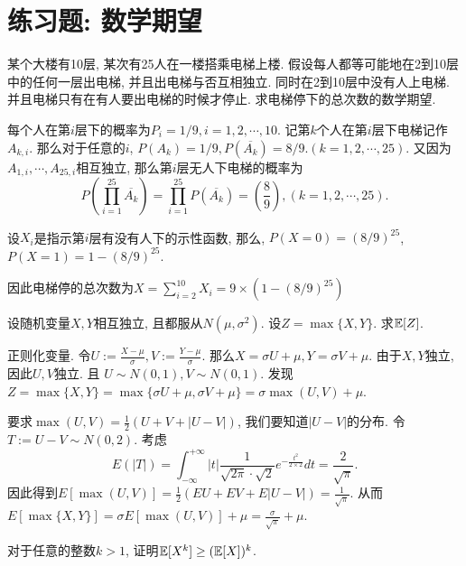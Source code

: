 \section*{练习题: 数学期望}

\begin{exercise}
    某个大楼有10层, 某次有25人在一楼搭乘电梯上楼. 假设每人都等可能地在2到10层中的任何一层出电梯, 并且出电梯与否互相独立. 同时在2到10层中没有人上电梯. 并且电梯只有在有人要出电梯的时候才停止. 求电梯停下的总次数的数学期望. 
\end{exercise}

\begin{solution*}
每个人在第$i$层下的概率为$P_i=1/9, i=1,2,\cdots, 10$. 记第$k$个人在第$i$层下电梯记作$A_{k,i}$. 那么对于任意的$i$, $P(A_k)=1/9, P(\overline{A_k})=8/9. (k=1,2,\cdots, 25)$. 又因为$A_{1, i}, \cdots, A_{25, i}$相互独立, 那么第$i$层无人下电梯的概率为
$$
P\left(\prod_{i=1}^{25} \overline{A_k}\right) = \prod_{i=1}^{25}P\left(\overline{A_k}\right) = \left(\frac89\right), (k=1,2,\cdots, 25).
$$

设$X_i$是指示第$i$层有没有人下的示性函数, 那么, $P(X=0)=(8/9)^{25}$, $P(X=1)=1-(8/9)^{25}$.

因此电梯停的总次数为$X=\sum_{i=2}^{10}X_i=9\times\left(1-(8/9)^{25}\right)$
\end{solution*}

\begin{exercise}
    设随机变量$X,Y$相互独立, 且都服从$N(\mu, \sigma^2)$. 设$Z=\max\{X,Y\}$. 求$\mathbb E[Z]$.
\end{exercise}

\begin{solution*}
    正则化变量. 令$U:=\frac{X-\mu}{\sigma}, V:=\frac{Y-\mu}{\sigma}$. 那么$X=\sigma U+\mu, Y=\sigma V+\mu$. 由于$X,Y$独立, 因此$U,V$独立. 且 $U \sim N(0,1), V \sim N(0,1)$. 发现$Z=\max \{X, Y\}=\max \{\sigma U+\mu, \sigma V+\mu\}=\sigma \max (U, V)+\mu$.

    要求$\max (U, V)=\frac{1}{2}(U+V+|U-V|)$, 我们要知道$|U-V|$的分布. 令$T:=U-V \sim N(0,2)$. 考虑$$E(|T|)=\int_{-\infty}^{+\infty}|t| \frac{1}{\sqrt{2 \pi} \cdot \sqrt{2}} e^{-\frac{t^2}{2 \times 2}} d t=\frac{2}{\sqrt{\pi}}.$$ 因此得到$E[\max (U, V)]=\frac{1}{2}(E U+E V+E|U-V|)=\frac{1}{\sqrt{\pi}}$. 从而$E[\max \{X, Y\}]=\sigma E[\max (U, V)]+\mu=\frac{\sigma}{\sqrt{\pi}}+\mu$. 
\end{solution*}

\begin{exercise}
    对于任意的整数$k>1$, 证明$\mathbb E[X^k]\geq (\mathbb E[X])^k$.
\end{exercise}

